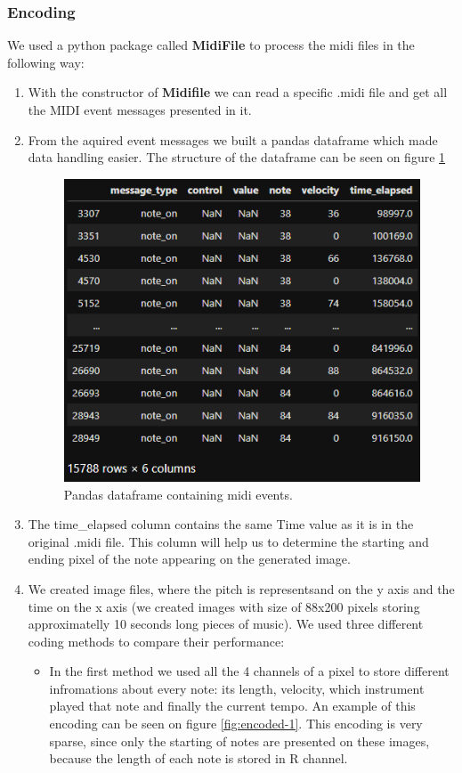 \documentclass{article}
\begin{document}
	\subsubsection{Encoding}
	We used a python package called \textbf{MidiFile} to process the midi files in the following way:
	\begin{enumerate}
		\item With the constructor of \textbf{Midifile} we can read a specific .midi file and get all the MIDI event messages presented in it. 
		\item From the aquired event messages we built a pandas dataframe which made data handling easier. The structure of the dataframe can be seen on figure \ref{fig:dframe}
		
		\begin{figure}[!htb]
			\centering
			\includegraphics[width=0.5\linewidth]{dframe.png}
			\caption{Pandas dataframe containing midi events.}
			\label{fig:dframe}
		\end{figure}
		\item The time\_elapsed column contains the same Time value as it is in the original .midi file. This column will help us to determine the starting and ending pixel of the note appearing on the generated image.
		\item We created image files, where the pitch is representsand on the y axis and the time on the x axis (we created images with size of 88x200 pixels storing approximatelly 10 seconds long pieces of music). We used three different coding methods to compare their performance: 
		\begin{itemize}
			\item In the first method we used all the 4 channels of a pixel to store different infromations about every note: its length, velocity, which instrument played that note and finally the current tempo. An example of this encoding can be seen on figure \ref{fig:encoded-1}. This encoding is very sparse, since only the starting of notes are presented on these images, because the length of each note is stored in R channel. 

\end{itemize}
\end{enumerate}
\end{document}
